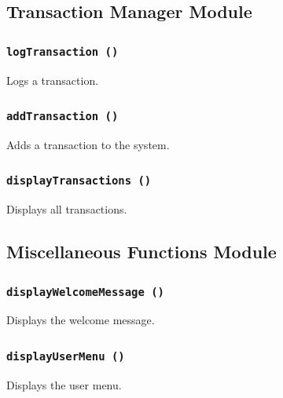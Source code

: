 \documentclass[12pt,a4paper]{report}
\begin{document}
\subsection{Transaction Manager Module}
\subsubsection{\texttt{logTransaction ()}}
Logs a transaction.


\subsubsection{\texttt{addTransaction ()}}
Adds a transaction to the system.


\subsubsection{\texttt{displayTransactions ()}}
Displays all transactions.


\subsection{Miscellaneous Functions Module}
\subsubsection{\texttt{displayWelcomeMessage ()}}
Displays the welcome message.


\subsubsection{\texttt{displayUserMenu ()}}
Displays the user menu.

\end{document}
